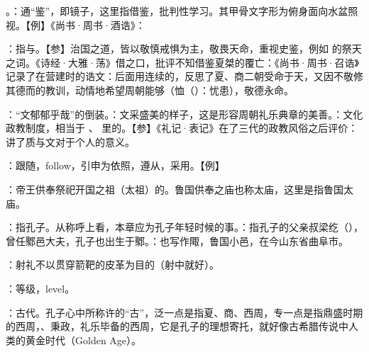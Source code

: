 {
\item {}。：通“鉴”，即镜子，这里指借鉴，批判性学习。其甲骨文字形为俯身面向水盆照视。【例】《尚书·周书·酒诰》：

：指与。【参】治国之道，皆以敬慎戒惧为主，敬畏天命，重视史鉴，例如  的祭天之词。《诗经·大雅·荡》借之口，批评不知借鉴夏桀的覆亡：《尚书·周书·召诰》记录了在营建时的诰文：后面用连续的，反思了夏、商二朝受命于天，又因不敬修其德而的教训，动情地希望周朝能够（恤（）：忧患），敬德永命。
\item {}：“文郁郁乎哉”的倒装。：文采盛美的样子，这是形容周朝礼乐典章的美善。：文化政教制度，相当于 、 里的。【参】《礼记·表记》在了三代的政教风俗之后评价：  讲了质与文对于个人的意义。

\item {}：跟随，follow，引申为依照，遵从，采用。【例】 
}
{}


{
\item {}：帝王供奉祭祀开国之祖（太祖）的。鲁国供奉之庙也称太庙，这里是指鲁国太庙。
\item {}：指孔子。从称呼上看，本章应为孔子年轻时候的事。：指孔子的父亲叔梁纥（），曾任鄹邑大夫，孔子也出生于鄹。：也写作陬，鲁国小邑，在今山东省曲阜市。
}
{}


{
\item {}：射礼不以贯穿箭靶的皮革为目的（射中就好）。
\item {}：等级，level。

\item {}：古代。孔子心中所称许的“古”，泛一点是指夏、商、西周，专一点是指鼎盛时期的西周，、秉政，礼乐毕备的西周，它是孔子的理想寄托，就好像古希腊传说中人类的黄金时代（Golden Age）。
}
{}  %


